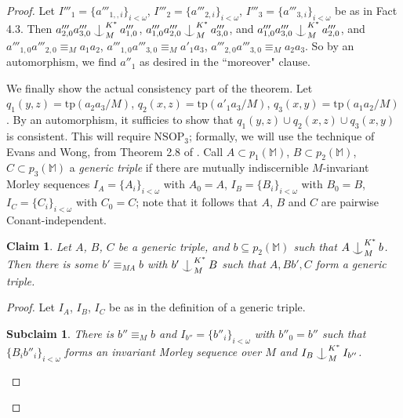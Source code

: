 \documentclass[12pt]{amsart}
\newtheorem{claim}[theorem]{Claim}
\newtheorem{subclaim}[theorem]{Subclaim}
\theoremstyle{definition}
\def\Ind#1#2{#1\setbox0=\hbox{$#1x$}\kern\wd0\hbox to 0pt{\hss$#1\mid$\hss}
\lower.9\ht0\hbox to 0pt{\hss$#1\smile$\hss}\kern\wd0}
\def\ind{\mathop{\mathpalette\Ind{}}}
\begin{document}
\begin{proof}
Let $I'''_{1}=\{a'''_{1,, i}\}_{i < \omega}$, $I'''_{2}=\{a'''_{2, i}\}_{i < \omega}$, $I'''_{3}=\{a'''_{3, i}\}_{i < \omega}$ be as in Fact 4.3. Then ${a'''_{2, 0}}{a'''_{3, 0}}\ind^{K^{*}}_{M}{a'''_{1, 0}}$, ${a'''_{1, 0}}{a'''_{2, 0}}\ind^{K^{*}}_{M}{a'''_{3, 0}}$, and ${a'''_{1, 0}}{a'''_{3, 0}}\ind^{K^{*}}_{M}{a'''_{2, 0}}$, and ${a'''_{1, 0}} {a'''_{2, 0}} \equiv_{M} a_{1}a_{2}$, ${a'''_{1, 0}} {a'''_{3, 0}} \equiv_{M} a'_{1}a_{3}$, ${a'''_{2, 0}} {a'''_{3, 0}} \equiv_{M} a_{2}a_{3}$. So by an automorphism, we find $a''_{1}$ as desired in the ``moreover" clause.





We finally show the actual consistency part of the theorem. Let $q_{1}(y, z) = \mathrm{tp}(a_{2} a_{3}/M)$, $q_{2}(x, z) = \mathrm{tp}(a'_{1} a_{3}/M)$, $q_{3}(x, y) = \mathrm{tp}(a_{1} a_{2}/M)$. By an automorphism, it sufficies to show that $q_{1}(y, z) \cup q_{2}(x, z) \cup q_{3}(x, y)$ is consistent. This will require $\mathrm{NSOP}_{3}$; formally, we will use the technique of Evans and Wong, from Theorem 2.8 of \cite{EW09}. Call $A \subset p_{1}(\mathbb{M})$, $B \subset p_{2}(\mathbb{M})$, $C \subset p_{3}(\mathbb{M})$ a \textit{generic triple} if there are mutually indiscernible $M$-invariant Morley sequences $I_{A} = \{A_{i}\}_{i < \omega}$ with $A_{0} = A$, $I_{B} = \{B_{i}\}_{i < \omega}$ with $B_{0} = B$,  $I_{C} = \{C_{i}\}_{i < \omega}$ with $C_{0} = C$; note that it follows that $A$, $B$ and $C$ are pairwise Conant-independent.

\begin{claim}\label{4-theclaim4}
    Let $A$, $B$, $C$ be a generic triple, and $b \subseteq p_{2}(\mathbb{M})$ such that $A \ind^{K^{*}}_{M} b$. Then there is some $b' \equiv_{MA} b$ with $b' \ind^{K^{*}}_{M} B$ such that $A, Bb', C$ form a generic triple.
\end{claim}

\begin{proof}
    Let $I_{A}$, $I_{B}$, $I_{C}$ be as in the definition of a generic triple.

    \begin{subclaim}
    There is $b'' \equiv_{M} b$ and $I_{b''}=\{b''_{i}\}_{i < \omega}$ with $b''_{0} = b''$ such that $\{B_{i} b''_{i}\}_{i < \omega}$ forms an invariant Morley sequence over $M$ and $I_{B} \ind^{K^{*}}_{M} I_{b''}$.
    
    \end{subclaim}


\end{proof}
\end{proof}
\end{document}
